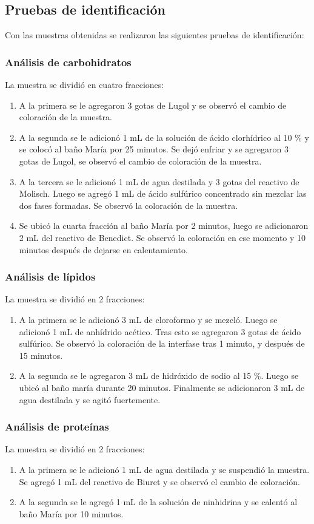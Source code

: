 \documentclass[fleqn,10pt]{SelfArx}
\begin{document}
	\subsection{Pruebas de identificación}
		Con las muestras obtenidas se realizaron las siguientes pruebas de identificación:
		\subsubsection{Análisis de carbohidratos}
			La muestra se dividió en cuatro fracciones:
			\begin{enumerate}
				\item A la primera se le agregaron 3 gotas de Lugol y se observó el cambio de coloración de la muestra.
				\item A la segunda se le adicionó 1 mL de la solución de ácido clorhídrico al 10 \% y se colocó al baño María por 25 minutos. Se dejó enfriar y se agregaron 3 gotas de Lugol, se observó el cambio de coloración de la muestra.
				\item A la tercera se le adicionó 1 mL de agua destilada y 3 gotas del reactivo de Molisch. Luego se agregó 1 mL de ácido sulfúrico concentrado sin mezclar las dos fases formadas. Se observó la coloración de la muestra.
				\item Se ubicó la cuarta fracción al baño María por 2 minutos, luego se adicionaron 2 mL del reactivo de Benedict. Se observó la coloración en ese momento y 10 minutos después de dejarse en calentamiento. 
			\end{enumerate}
		\subsubsection{Análisis de lípidos}
			La muestra se dividió en 2 fracciones:
			\begin{enumerate}
				\item A la primera se le adicionó 3 mL de cloroformo y se mezcló. Luego se adicionó 1 mL de anhídrido acético. Tras esto se agregaron 3 gotas de ácido sulfúrico. Se observó la coloración de la interfase tras 1 minuto, y después de 15 minutos.
				\item A la segunda se le agregaron 3 mL de hidróxido de sodio al 15 \%. Luego se ubicó al baño maría durante 20 minutos. Finalmente se adicionaron 3 mL de agua destilada y se agitó fuertemente. 
			\end{enumerate}
		
		\subsubsection{Análisis de proteínas}
			La muestra se dividió en 2 fracciones:
			\begin{enumerate}
				\item A la primera se le adicionó 1 mL de agua destilada y se suspendió la muestra. Se agregó 1 mL del reactivo de Biuret y se observó el cambio de coloración.
				\item A la segunda se le agregó 1 mL de la solución de ninhidrina y se calentó al baño María por 10 minutos.
			\end{enumerate}
\end{document}
